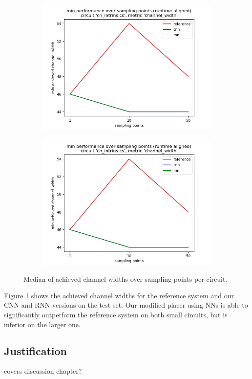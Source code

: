 \begin{figure}
\begin{subfigure}[b]{0.45\linewidth}
		\includegraphics[width=\linewidth]{plots/eval-ch_intrinsics-chan-width-min.png}
	\end{subfigure}
	\begin{subfigure}[b]{0.45\linewidth}
		\includegraphics[width=\linewidth]{plots/eval-ch_intrinsics-chan-width-min.png}
	\end{subfigure}
	\caption{Median of achieved channel widths over sampling points per circuit.}
	\label{fig:eval-median}
\end{figure}

Figure \ref{fig:eval-median} shows the achieved channel widths for the reference system and our \gls{CNN} and \gls{RNN} versions on the test set. Our modified placer using \glspl{NN} is able to significantly outperform the reference system on both small circuits, but is inferior on the larger one. 

\subsection{Justification}

covers discussion chapter?
